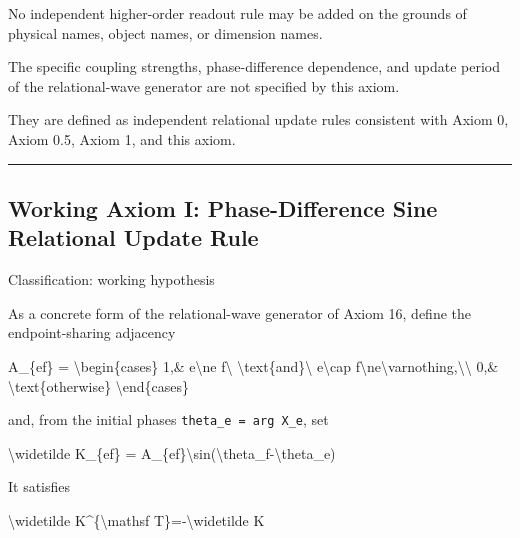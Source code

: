 \documentclass[
  a4paper,
]{article}
\newenvironment{Shaded}{}{}
\newcommand{\NormalTok}[1]{#1}
\begin{document}
No independent higher-order readout rule may be added on the grounds of
physical names, object names, or dimension names.

The specific coupling strengths, phase-difference dependence, and update
period of the relational-wave generator are not specified by this axiom.

They are defined as independent relational update rules consistent with
Axiom 0, Axiom 0.5, Axiom 1, and this axiom.

\begin{center}\rule{0.5\linewidth}{0.5pt}\end{center}

\subsection{Working Axiom I: Phase-Difference Sine Relational Update
Rule}\label{working-axiom-i-phase-difference-sine-relational-update-rule}

Classification: working hypothesis

As a concrete form of the relational-wave generator of Axiom 16, define
the endpoint-sharing adjacency

\begin{Shaded}
\begin{Highlighting}[]
\NormalTok{A\_\{ef\}}
\NormalTok{=}
\NormalTok{\textbackslash{}begin\{cases\}}
\NormalTok{1,\& e\textbackslash{}ne f\textbackslash{} \textbackslash{}text\{and\}\textbackslash{} e\textbackslash{}cap f\textbackslash{}ne\textbackslash{}varnothing,\textbackslash{}\textbackslash{}}
\NormalTok{0,\& \textbackslash{}text\{otherwise\}}
\NormalTok{\textbackslash{}end\{cases\}}
\end{Highlighting}
\end{Shaded}

and, from the initial phases \texttt{theta\_e\ =\ arg\ X\_e}, set

\begin{Shaded}
\begin{Highlighting}[]
\NormalTok{\textbackslash{}widetilde K\_\{ef\}}
\NormalTok{=}
\NormalTok{A\_\{ef\}\textbackslash{}sin(\textbackslash{}theta\_f{-}\textbackslash{}theta\_e)}
\end{Highlighting}
\end{Shaded}

It satisfies

\begin{Shaded}
\begin{Highlighting}[]
\NormalTok{\textbackslash{}widetilde K\^{}\{\textbackslash{}mathsf T\}={-}\textbackslash{}widetilde K}
\end{Highlighting}
\end{Shaded}
\end{document}
